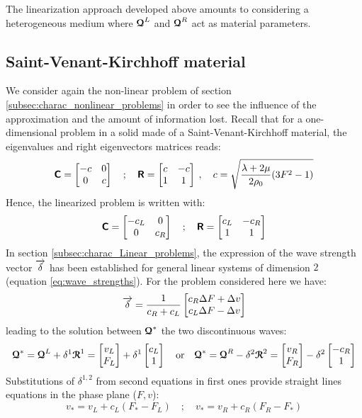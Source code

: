 \begin{remark}
  The linearization approach developed above amounts to considering a heterogeneous medium where ${\boldsymbol{\mathcal{Q}}}^{L}$ and ${\boldsymbol{\mathcal{Q}}}^R$ act as material parameters.
\end{remark}

\subsection{Saint-Venant-Kirchhoff material}
We consider again the non-linear problem of section \ref{subsec:charac_nonlinear_problems} in order to see the influence of the approximation and the amount of information lost. Recall that for a one-dimensional problem in a solid made of a Saint-Venant-Kirchhoff material, the eigenvalues and right eigenvectors matrices reads:
\begin{equation}
  \label{eq:SVK_matrices}
  \boldsymbol{\mathsf{C}} = \left[\begin{matrix}-c & 0 \\ 0 & c\end{matrix}\right] \quad ; \quad \boldsymbol{\mathsf{R}} = \left[\begin{matrix}c & -c\\ 1&1\end{matrix}\right] \:,\quad c=\sqrt{\frac{\lambda + 2\mu}{2\rho_0}(3F^2-1)}
\end{equation}
Hence, the linearized problem is written with:
\begin{equation}
  \label{eq:SVK_matrices_linear}
  \boldsymbol{\mathsf{C}} = \left[\begin{matrix}-c_L & 0 \\ 0 & c_R\end{matrix}\right] \quad ; \quad \boldsymbol{\mathsf{R}} = \left[\begin{matrix}c_L & -c_R\\ 1&1\end{matrix}\right]
\end{equation}
In section \ref{subsec:charac_Linear_problems}, the expression of the wave strength vector ${\overrightarrow{\delta}}$ has been established for general linear systems of dimension $2$ (equation \eqref{eq:wave_strengths}). For the problem considered here we have:
\begin{equation}
  {\overrightarrow{\delta}}=\frac{1}{c_R+c_L}\left[\begin{matrix}c_R \Delta F +\Delta v\\ c_L \Delta F -\Delta v\end{matrix}\right]
\end{equation}
leading to the solution between ${\boldsymbol{\mathcal{Q}}}^*$ the two discontinuous waves:
\begin{equation}
  \label{eq:SVK_approx_solution}
  {\boldsymbol{\mathcal{Q}}}^* = {\boldsymbol{\mathcal{Q}}}^L + \delta^1 {\boldsymbol{\mathcal{R}}}^1 = \left[\begin{matrix}v_L \\F_L\end{matrix}\right] +\delta^1 \left[\begin{matrix}c_L \\1\end{matrix}\right] \quad \text{or} \quad {\boldsymbol{\mathcal{Q}}}^* = {\boldsymbol{\mathcal{Q}}}^R - \delta^2 {\boldsymbol{\mathcal{R}}}^2 = \left[\begin{matrix}v_R \\F_R\end{matrix}\right] -\delta^2 \left[\begin{matrix}-c_R \\1\end{matrix}\right]
\end{equation}
Substitutions of $\delta^{1,2}$ from second equations in first ones provide straight lines equations in the phase plane ($F,v$):
\begin{equation}
  \label{eq:approx_straight}
  v_* = v_L + c_L(F_*-F_L) \quad ; \quad v_* = v_R + c_R(F_R-F_*)
\end{equation}

